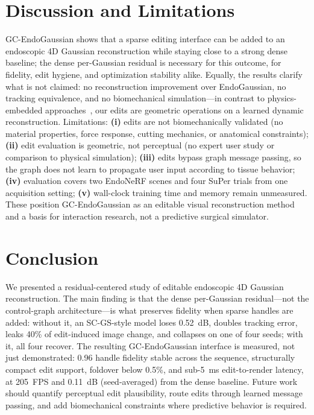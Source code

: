 \documentclass[AMA,Times1COL]{WileyNJDv5} %
\begin{document}
\section{Discussion and Limitations}\label{sec6}

GC-EndoGaussian shows that a sparse editing interface can be added to an endoscopic 4D Gaussian reconstruction while staying close to a strong dense baseline; the dense per-Gaussian residual is necessary for this outcome, for fidelity, edit hygiene, and optimization stability alike. Equally, the results clarify what is not claimed: no reconstruction improvement over EndoGaussian, no tracking equivalence, and no biomechanical simulation---in contrast to physics-embedded approaches~\cite{yang2024simendogs,yang2025sparsesim}, our edits are geometric operations on a learned dynamic reconstruction. Limitations: \textbf{(i)} edits are not biomechanically validated (no material properties, force response, cutting mechanics, or anatomical constraints); \textbf{(ii)} edit evaluation is geometric, not perceptual (no expert user study or comparison to physical simulation); \textbf{(iii)} edits bypass graph message passing, so the graph does not learn to propagate user input according to tissue behavior; \textbf{(iv)} evaluation covers two EndoNeRF scenes and four SuPer trials from one acquisition setting; \textbf{(v)} wall-clock training time and memory remain unmeasured. These position GC-EndoGaussian as an editable visual reconstruction method and a basis for interaction research, not a predictive surgical simulator.

\section{Conclusion}\label{sec7}

We presented a residual-centered study of editable endoscopic 4D Gaussian reconstruction. The main finding is that the dense per-Gaussian residual---not the control-graph architecture---is what preserves fidelity when sparse handles are added: without it, an SC-GS-style model loses 0.52~dB, doubles tracking error, leaks 40\% of edit-induced image change, and collapses on one of four seeds; with it, all four recover. The resulting GC-EndoGaussian interface is measured, not just demonstrated: 0.96 handle fidelity stable across the sequence, structurally compact edit support, foldover below 0.5\%, and sub-5~ms edit-to-render latency, at 205~FPS and 0.11~dB (seed-averaged) from the dense baseline. Future work should quantify perceptual edit plausibility, route edits through learned message passing, and add biomechanical constraints where predictive behavior is required.


\end{document}
